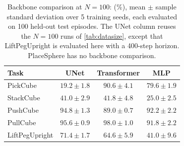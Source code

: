 \begin{table}[htbp]
  \centering
  \caption{Backbone comparison at $N=100$: \metriconce{} (\%), mean $\pm$
  sample standard deviation over 5 training seeds, each evaluated on 100
  held-out test episodes. The UNet column reuses the $N=100$ runs of
  \cref{tab:datasize}, except that LiftPegUpright is evaluated here with a
  400-step horizon. PlaceSphere has no backbone comparison.}
  \label{tab:backbones}
  \small
  \begin{tabularx}{\linewidth}{@{}Yccc@{}}
    \toprule
    Task & UNet & Transformer & MLP \\
    \midrule
    PickCube & $19.2\pm1.8$ & $90.6\pm4.1$ & $79.6\pm1.9$ \\
    StackCube & $41.0\pm2.9$ & $41.8\pm4.8$ & $25.0\pm2.5$ \\
    PushCube & $94.8\pm1.3$ & $89.0\pm0.7$ & $92.2\pm2.2$ \\
    PullCube & $95.6\pm0.9$ & $98.0\pm1.0$ & $91.8\pm2.2$ \\
    LiftPegUpright & $71.4\pm1.7$ & $64.6\pm5.9$ & $41.0\pm9.6$ \\
    \bottomrule
  \end{tabularx}
\end{table}
